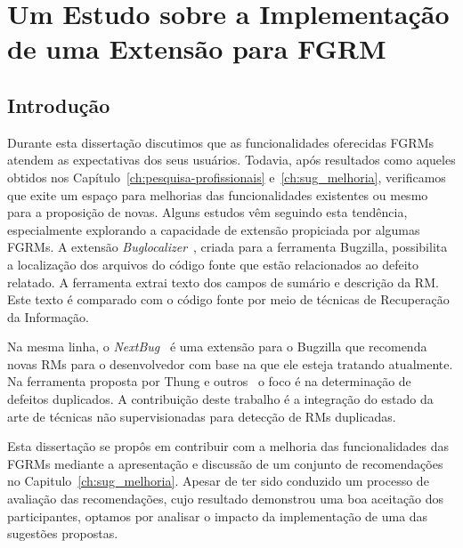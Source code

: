 \chapter{Um Estudo sobre a Implementação de uma Extensão para FGRM}
\label{ch:implemtacao_extensao}

\section{Introdução}
\label{sec:implemtacao_extensao_intro}

Durante esta dissertação discutimos que as funcionalidades oferecidas FGRMs
atendem as expectativas dos seus usuários. Todavia, após resultados como aqueles
obtidos nos Capítulo~\ref{ch:pesquisa-profissionais} e~\ref{ch:sug_melhoria},
verificamos que exite um espaço para melhorias das funcionalidades existentes ou
mesmo para a proposição de novas. Alguns estudos vêm seguindo esta tendência,
especialmente explorando a capacidade de extensão propiciada por algumas FGRMs.
A extensão \textit{Buglocalizer}~\cite{Thung:2014:BIT:2635868.2661678}, criada
para a ferramenta Bugzilla, possibilita a localização dos arquivos do código
fonte que estão relacionados ao defeito relatado. A ferramenta extrai texto dos
campos de sumário e descrição da RM\@. Este texto é comparado com o código fonte
por meio de técnicas de Recuperação da Informação.

Na mesma linha, o \textit{NextBug}~\cite{101186} é uma extensão para o Bugzilla
que recomenda novas RMs para o desenvolvedor com base na que ele esteja tratando
atualmente. Na ferramenta proposta por Thung e
outros~\cite{Thung:2014:DIT:2642937.2648627} o foco é na determinação de
defeitos duplicados. A contribuição deste trabalho é a integração do estado da
arte de técnicas não supervisionadas para detecção de RMs duplicadas.

Esta dissertação se propôs em contribuir com a melhoria das funcionalidades das
FGRMs mediante a apresentação e discussão de um conjunto de recomendações no
Capitulo~\ref{ch:sug_melhoria}. Apesar de ter sido conduzido um processo de
avaliação das recomendações, cujo resultado demonstrou uma boa aceitação dos
participantes, optamos por analisar o impacto da implementação de uma das
sugestões propostas.

